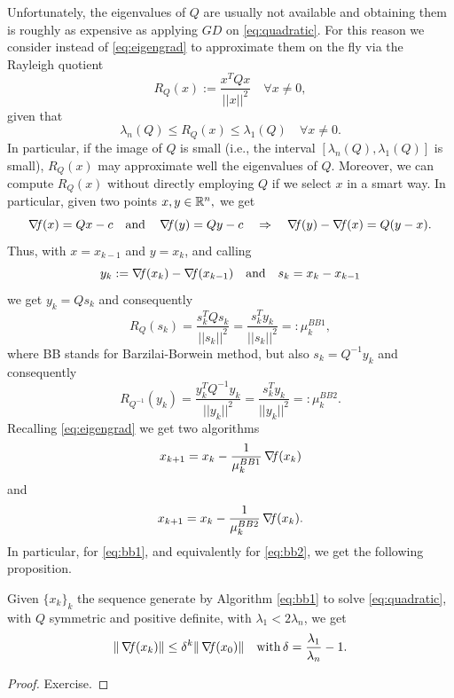 \documentclass[10pt,a4paper]{article}
\begin{document}
Unfortunately, the eigenvalues of $Q$ are usually not available and obtaining them is roughly as expensive as applying $GD$ on \eqref{eq:quadratic}. For this reason we consider instead of \eqref{eq:eigengrad} to approximate them on the fly via the Rayleigh quotient
\begin{equation*}
	R_Q(x) := \frac{x^TQx}{||x||^2} \quad \forall x\neq 0,
\end{equation*}
given that 
\begin{equation*}
	\lambda_n(Q) \leq R_Q(x) \leq \lambda_1(Q) \quad \forall x\neq 0. 
\end{equation*}
In particular, if the image of $Q$ is small (i.e., the interval $[\lambda_n(Q),\lambda_1(Q)]$ is small), $R_Q(x)$ may approximate well the eigenvalues of $Q$. Moreover, we can compute $R_Q(x)$ without directly employing $Q$ if we select $x$ in a smart way. In particular, given two points $x,y\in\mathbb{R}^n,$ we get 
\begin{equation*}
	\operatorname*{\mathit{\nabla \!f}}(x) = Qx-c \quad \text{and}\quad \operatorname*{\mathit{\nabla \!f}}(y) = Qy-c \quad \Rightarrow \quad \operatorname*{\mathit{\nabla \!f}}(y) - \operatorname*{\mathit{\nabla \!f}}(x) = Q(y-x).
\end{equation*} 
Thus, with $x=x_{k-1}$ and $y=x_k$, and calling 
\begin{equation*}
	y_k:= \operatorname*{\mathit{\nabla \!f}}(x_k) - \operatorname*{\mathit{\nabla \!f}}(x_{k-1})  \quad \text{and} \quad s_k= x_k -x_{k-1}
\end{equation*}
we get $y_k = Qs_k$ and consequently
\begin{equation}\label{eq:railey_bb1}
	R_Q(s_k) = \frac{s_k^TQs_k}{||s_k||^2} =  \frac{s_k^Ty_k}{||s_k||^2}=: \mu_k^{BB1},
\end{equation}
where BB stands for Barzilai-Borwein method, but also $s_k=Q^{-1}y_k$ and consequently
\begin{equation*}
	R_{Q^{-1}}(y_k) = \frac{y_k^TQ^{-1}y_k}{||y_k||^2} =  \frac{s_k^Ty_k}{||y_k||^2}=: \mu_k^{BB2}.
\end{equation*}
Recalling \eqref{eq:eigengrad} we get two algorithms
\begin{equation}\label{eq:bb1}
	x_{k+1} = x_k -\frac{1}{\mu_k^{BB1}} \operatorname*{\mathit{\nabla \!f}}(x_k) 
\end{equation}
and 
\begin{equation}\label{eq:bb2}
	x_{k+1} = x_k -\frac{1}{\mu_k^{BB2}} \operatorname*{\mathit{\nabla \!f}}(x_k).
\end{equation}
In particular, for \eqref{eq:bb1}, and equivalently for \eqref{eq:bb2}, we get the following proposition.
\begin{proposition}
	Given $\{x_k\}_k$ the sequence generate by Algorithm \eqref{eq:bb1} to solve \eqref{eq:quadratic}, with $Q$ symmetric and positive definite, with $\lambda_1<2\lambda_n$, we get 
	\begin{equation*}
		\| \operatorname*{\mathit{\nabla \!f}}(x_k)\|\leq \delta^k \|\operatorname*{\mathit{\nabla \!f}}(x_0)\| \quad \mathord{\mathrm{with }}\, \delta=\frac{\lambda_1}{\lambda_n}-1.
	\end{equation*}
\end{proposition}
\begin{proof}
Exercise.
\end{proof}
\end{document}
